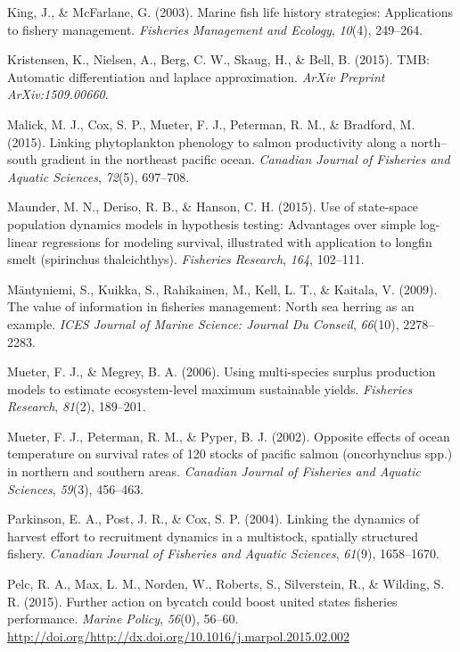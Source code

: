 \documentclass[12pt,]{scrartcl}
\begin{document}
\hypertarget{ref-king2003marine}{}
King, J., \& McFarlane, G. (2003). Marine fish life history strategies:
Applications to fishery management. \emph{Fisheries Management and
Ecology}, \emph{10}(4), 249--264.

\hypertarget{ref-kristensen2015tmb}{}
Kristensen, K., Nielsen, A., Berg, C. W., Skaug, H., \& Bell, B. (2015).
TMB: Automatic differentiation and laplace approximation. \emph{ArXiv
Preprint ArXiv:1509.00660}.

\hypertarget{ref-malick2015linking}{}
Malick, M. J., Cox, S. P., Mueter, F. J., Peterman, R. M., \& Bradford,
M. (2015). Linking phytoplankton phenology to salmon productivity along
a north--south gradient in the northeast pacific ocean. \emph{Canadian
Journal of Fisheries and Aquatic Sciences}, \emph{72}(5), 697--708.

\hypertarget{ref-maunder2015use}{}
Maunder, M. N., Deriso, R. B., \& Hanson, C. H. (2015). Use of
state-space population dynamics models in hypothesis testing: Advantages
over simple log-linear regressions for modeling survival, illustrated
with application to longfin smelt (spirinchus thaleichthys).
\emph{Fisheries Research}, \emph{164}, 102--111.

\hypertarget{ref-mantyniemi2009value}{}
Mäntyniemi, S., Kuikka, S., Rahikainen, M., Kell, L. T., \& Kaitala, V.
(2009). The value of information in fisheries management: North sea
herring as an example. \emph{ICES Journal of Marine Science: Journal Du
Conseil}, \emph{66}(10), 2278--2283.

\hypertarget{ref-mueter2006using}{}
Mueter, F. J., \& Megrey, B. A. (2006). Using multi-species surplus
production models to estimate ecosystem-level maximum sustainable
yields. \emph{Fisheries Research}, \emph{81}(2), 189--201.

\hypertarget{ref-mueter2002opposite}{}
Mueter, F. J., Peterman, R. M., \& Pyper, B. J. (2002). Opposite effects
of ocean temperature on survival rates of 120 stocks of pacific salmon
(oncorhynchus spp.) in northern and southern areas. \emph{Canadian
Journal of Fisheries and Aquatic Sciences}, \emph{59}(3), 456--463.

\hypertarget{ref-parkinson2004linking}{}
Parkinson, E. A., Post, J. R., \& Cox, S. P. (2004). Linking the
dynamics of harvest effort to recruitment dynamics in a multistock,
spatially structured fishery. \emph{Canadian Journal of Fisheries and
Aquatic Sciences}, \emph{61}(9), 1658--1670.

\hypertarget{ref-Pelc201556}{}
Pelc, R. A., Max, L. M., Norden, W., Roberts, S., Silverstein, R., \&
Wilding, S. R. (2015). Further action on bycatch could boost united
states fisheries performance. \emph{Marine Policy}, \emph{56}(0),
56--60.
\url{http://doi.org/http://dx.doi.org/10.1016/j.marpol.2015.02.002}
\end{document}
